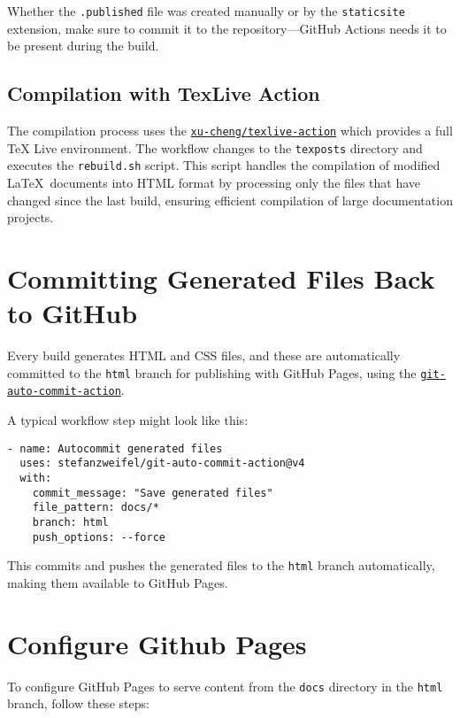 \documentclass{article}
\begin{document}
Whether the \texttt{.published} file was created manually or by the \texttt{staticsite}
extension, make sure to commit it to the repository—GitHub Actions needs it to
be present during the build.

\subsection{Compilation with TexLive Action}

The compilation process uses the \href{https://github.com/xu-cheng/texlive-action}{\texttt{xu-cheng/texlive-action}}
which provides a full TeX Live environment. The workflow changes to the \texttt{texposts} directory
and executes the \texttt{rebuild.sh} script. This script handles the compilation of modified
\LaTeX\ documents into HTML format by processing only the files that have changed since
the last build, ensuring efficient compilation of large documentation projects.

\section{Committing Generated Files Back to GitHub}

Every build generates HTML and CSS files, and these are automatically committed
to the \texttt{html} branch for publishing with GitHub Pages, using the
\href{https://github.com/stefanzweifel/git-auto-commit-action}{\texttt{git-auto-commit-action}}.

A typical workflow step might look like this:

\begin{verbatim}
- name: Autocommit generated files
  uses: stefanzweifel/git-auto-commit-action@v4
  with:
    commit_message: "Save generated files"
    file_pattern: docs/*
    branch: html
    push_options: --force
\end{verbatim}

This commits and pushes the generated files to the \texttt{html} branch automatically, 
making them available to GitHub Pages.

\section{Configure Github Pages}

To configure GitHub Pages to serve content from the \texttt{docs} directory in the \texttt{html} branch, follow these steps:
\end{document}
